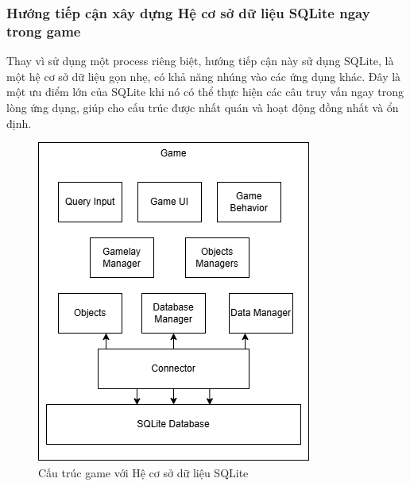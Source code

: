 \subsubsection{Hướng tiếp cận xây dựng Hệ cơ sở dữ liệu SQLite ngay trong game}
\hspace*{1cm} Thay vì sử dụng một process riêng biệt, hướng tiếp cận này sử dụng SQLite, là một hệ cơ sở dữ liệu gọn nhẹ, có khả năng nhúng vào các ứng dụng khác. Đây là một ưu điểm lớn của SQLite khi nó có thể thực hiện các câu truy vấn ngay trong lòng ứng dụng, giúp cho cấu trúc được nhất quán và hoạt động đồng nhất và ổn định.
\begin{figure}[H]
	\centering
	\includegraphics[width=\textwidth]{Images/SQLITE.png}
	\vspace{0.5cm}
	\caption{Cấu trúc game với Hệ cơ sở dữ liệu SQLite}
\end{figure}